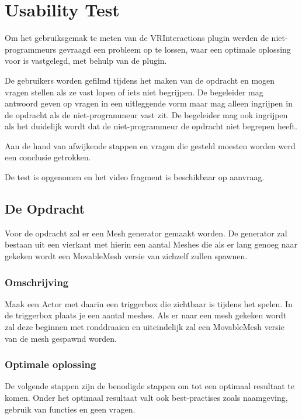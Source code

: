 
\chapter{Usability Test}
\label{appendix:usertest1}
\lhead{}

Om het gebruiksgemak te meten van de VRInteractions plugin werden de niet-programmeurs gevraagd een probleem op te lossen, waar een optimale oplossing voor is vastgelegd, met behulp van de plugin. 

De gebruikers worden gefilmd tijdens het maken van de opdracht en mogen vragen stellen als ze vast lopen of iets niet begrijpen. De begeleider mag antwoord geven op vragen in een uitleggende vorm maar mag alleen ingrijpen in de opdracht als de niet-programmeur vast zit. De begeleider mag ook ingrijpen als het duidelijk wordt dat de niet-programmeur de opdracht niet begrepen heeft.

Aan de hand van afwijkende stappen en vragen die gesteld moesten worden werd een conclusie getrokken.

De test is opgenomen en het video fragment is beschikbaar op aanvraag.

\section{De Opdracht}
Voor de opdracht zal er een Mesh generator gemaakt worden. De generator zal bestaan uit een vierkant met hierin een aantal Meshes die als er lang genoeg naar gekeken wordt een MovableMesh versie van zichzelf zullen spawnen.

\subsection*{Omschrijving}
Maak een Actor met daarin een triggerbox die zichtbaar is tijdens het spelen. In de triggerbox plaats je een aantal meshes. Als er naar een mesh gekeken wordt zal deze beginnen met ronddraaien en uiteindelijk zal een MovableMesh versie van de mesh gespawnd worden. 

\subsection*{Optimale oplossing}
De volgende stappen zijn de benodigde stappen om tot een optimaal resultaat te komen. Onder het optimaal resultaat valt ook best-practises zoals naamgeving, gebruik van functies en geen vragen.

